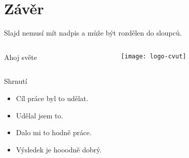 \section{Závěr}
\begin{frame}[fragile]
Slajd nemusí mít nadpis a může být rozdělen do sloupců.
\begin{columns}
\begin{column}{.4\textwidth}
\begin{exampleblock}{Ahoj světe}
\end{exampleblock}
\end{column}
\begin{column}{.4\textwidth}
\begin{center}
\texttt{[image: logo-cvut]}
\end{center}
\end{column}
\end{columns}
\end{frame}

\begin{frame}{Shrnutí}
\begin{itemize}
\item  Cíl práce byl to udělat.
\item Udělal jsem to.
\item Dalo mi to hodně práce.
\item Výsledek je hooodně dobrý.
\end{itemize}

\end{frame}